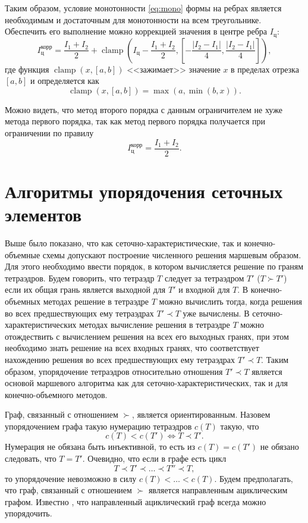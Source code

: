 Таким образом, условие монотонности \eqref{eq:mono} формы на ребрах является необходимым и достаточным для монотонности на всем треугольнике. Обеспечить его выполнение можно коррекцией значения в центре ребра $I_\text{ц}$:
\[
I_\text{ц}^\text{корр} = 
\frac{I_1 + I_2}{2} + \operatorname{clamp}\left(
I_\text{ц} - \frac{I_1 + I_2}{2}, 
\left[
-\frac{|I_2 - I_1|}{4},
\frac{|I_2 - I_1|}{4}
\right]
\right),
\]
где функция $\operatorname{clamp}(x, [a, b])$ <<зажимает>> значение $x$ в пределах отрезка $[a, b]$ и определяется как
\[
\operatorname{clamp}(x, [a, b]) = \max(a, \min(b, x)).
\]

Можно видеть, что метод второго порядка с данным ограничителем не хуже метода первого порядка, так как метод первого порядка получается при ограничении по правилу
\[
I_\text{ц}^\text{корр} = \frac{I_1 + I_2}{2}.
\]

\section{Алгоритмы упорядочения сеточных элементов}

Выше было показано, что как сеточно-характеристические, так и конечно-объемные схемы допускают построение численного решения маршевым образом. Для этого необходимо ввести порядок, в котором вычисляется решение по граням тетраэдров. Будем говорить, что тетраэдр $T$ следует за тетраэдром $T'$ ($T \succ T'$) если их общая грань является выходной для $T'$ и входной для $T$. В конечно-объемных методах решение в тетраэдре $T$ можно вычислить тогда, когда решения во всех предшествующих ему тетраэдрах $T' \prec T$ уже вычислены. В сеточно-характеристических методах вычисление решения в тетраэдре $T$ можно отождествить с вычислением решения на всех его выходных гранях, при этом необходимо знать решение на всех входных гранях, что соответствует нахождению решения во всех предшествующих ему тетраэдрах $T' \prec T$. Таким образом, упорядочение тетраэдров относительно отношения $T' \prec T$ является основой маршевого алгоритма как для сеточно-характеристических, так и для конечно-объемного методов.

Граф, связанный с отношением $\succ$, является ориентированным. Назовем упорядочением графа такую нумерацию тетраэдров $c(T)$ такую, что \[c(T) < c(T') \Leftrightarrow T \prec T'.\]
Нумерация не обязана быть инъективной, то есть из $c(T) = c(T')$ не обязано следовать, что $T = T'$.
Очевидно, что если в графе есть цикл
\[
T \prec T' \prec \dots \prec T'' \prec T,
\]
то упорядочение невозможно в силу $c(T) < \dots < c(T)$. Будем предполагать, что граф, связанный с отношением $\succ$ является направленным ациклическим графом. Известно \cite{Kahn1962}, что направленный ациклический граф всегда можно упорядочить.

